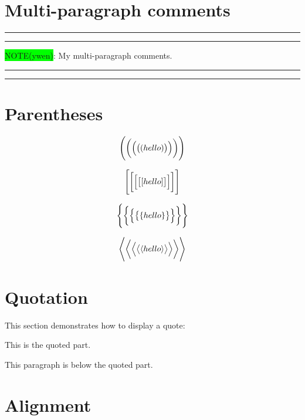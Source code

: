 \documentclass[12pt, letterpaper, oneside]{article}
\begin{document}
\section{Multi-paragraph comments}

\noindent\rule[-9pt]{1cm}{10pt}\rule{10cm}{0.4pt}

\colorbox{lime}{NOTE(ywen)}: My multi-paragraph comments.

\noindent\rule{10cm}{0.4pt}\rule{1cm}{10pt}

\section{Parentheses}

\[\Biggl(\biggl(\Bigl(\bigl((hello)\bigr)\Bigr)\biggr)\Biggr)\]

\[\Biggl[\biggl[\Bigl[\bigl[[hello]\bigr]\Bigr]\biggr]\Biggr]\]

\[\Biggl\{\biggl\{\Bigl\{\bigl\{\{hello\}\bigr\}\Bigr\}\biggr\}\Biggr\}\]

\[
  \Biggl \langle \biggl \langle \Bigl \langle \bigl \langle
  \langle
  hello
  \rangle
  \bigr \rangle \Bigr \rangle \biggr \rangle \Biggr \rangle
\]

\section{Quotation}

This section demonstrates how to display a quote:

\begin{displayquote}
  This is the quoted part.
\end{displayquote}

This paragraph is below the quoted part.

\section{Alignment}
\end{document}
